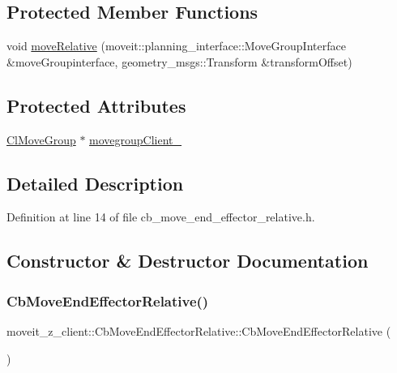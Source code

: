 \subsection*{Protected Member Functions}
\begin{DoxyCompactItemize}
\item 
void \hyperlink{classmoveit__z__client_1_1CbMoveEndEffectorRelative_ae80ce575678a1f602d2fc1f68df1813f}{move\+Relative} (moveit\+::planning\+\_\+interface\+::\+Move\+Group\+Interface \&move\+Groupinterface, geometry\+\_\+msgs\+::\+Transform \&transform\+Offset)
\end{DoxyCompactItemize}
\subsection*{Protected Attributes}
\begin{DoxyCompactItemize}
\item 
\hyperlink{classmoveit__z__client_1_1ClMoveGroup}{Cl\+Move\+Group} $\ast$ \hyperlink{classmoveit__z__client_1_1CbMoveEndEffectorRelative_a5f009b3baaaa47ad3be09d43bab33c07}{movegroup\+Client\+\_\+}
\end{DoxyCompactItemize}


\subsection{Detailed Description}


Definition at line 14 of file cb\+\_\+move\+\_\+end\+\_\+effector\+\_\+relative.\+h.



\subsection{Constructor \& Destructor Documentation}
\mbox{\label{classmoveit__z__client_1_1CbMoveEndEffectorRelative_aeabc32977cfd2e7bc34eef1cfd27d8a6}} 
\subsubsection{\texorpdfstring{Cb\+Move\+End\+Effector\+Relative()}{CbMoveEndEffectorRelative()}\hspace{0.1cm}{\footnotesize\ttfamily [1/2]}}
{\footnotesize\ttfamily moveit\+\_\+z\+\_\+client\+::\+Cb\+Move\+End\+Effector\+Relative\+::\+Cb\+Move\+End\+Effector\+Relative (\begin{DoxyParamCaption}{ }\end{DoxyParamCaption})}



